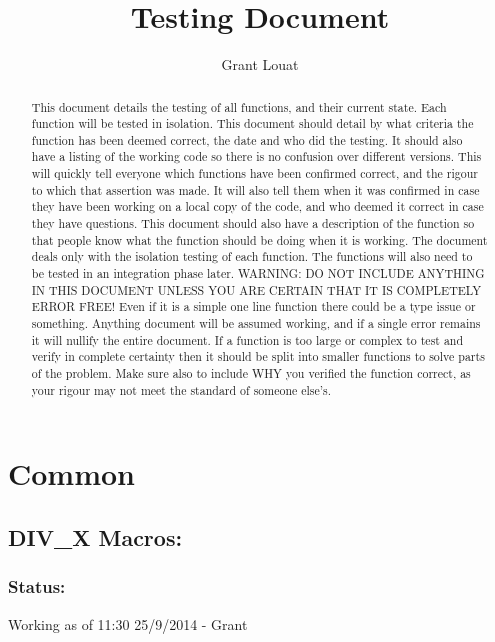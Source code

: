 \documentclass[]{report}
\title{Testing Document}
\author{Grant Louat}
\begin{document}
\maketitle

\newpage

\begin{abstract}
This document details the testing of all functions, and their current state. Each function will be tested in isolation. This document should detail by what criteria the function has been deemed correct, the date and who did the testing. It should also have a listing of the working code so there is no confusion over different versions. This will quickly tell everyone which functions have been confirmed correct, and the rigour to which that assertion was made. It will also tell them when it was confirmed in case they have been working on a local copy of the code, and who deemed it correct in case they have questions. This document should also have a description of the function so that people know what the function should be doing when it is working.\newline
The document deals only with the isolation testing of each function. The functions will also need to be tested in an integration phase later. \newline
WARNING: DO NOT INCLUDE ANYTHING IN THIS DOCUMENT UNLESS YOU ARE CERTAIN THAT IT IS COMPLETELY ERROR FREE! \newline Even if it is a simple one line function there could be a type issue or something. Anything document will be assumed working, and if a single error remains it will nullify the entire document. If a function is too large or complex to test and verify in complete certainty then it should be split into smaller functions to solve parts of the problem. Make sure also to include WHY you verified the function correct, as your rigour may not meet the standard of someone else's.
\end{abstract}

\newpage
\section{Common}

\subsection{DIV\_X Macros:}
\subsubsection{Status:}
Working as of 11:30 25/9/2014 - Grant
\end{document}
